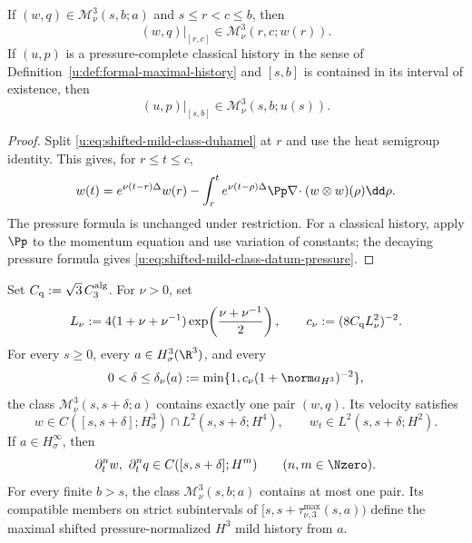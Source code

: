 \begin{lemma}
\label{u:lem:shifted-mild-restriction}
If \((w,q)\in\mathscr M_\nu^3(s,b;a)\) and
\(s\le r<c\le b\), then
\begin{equation}
 (w,q)|_{[r,c]}\in\mathscr M_\nu^3(r,c;w(r)).
 \label{u:eq:shifted-mild-restriction}
\end{equation}
If \((u,p)\) is a pressure-complete classical history in the sense of
Definition~\ref{u:def:formal-maximal-history} and
\([s,b]\) is contained in its interval of existence, then
\begin{equation}
 (u,p)|_{[s,b]}\in\mathscr M_\nu^3(s,b;u(s)).
 \label{u:eq:classical-mild-admission}
\end{equation}
\end{lemma}

\begin{proof}
Split \eqref{u:eq:shifted-mild-class-duhamel} at \(r\) and use the heat
semigroup identity.  This gives, for \(r\le t\le c\),
\[
 w(t)=e^{\nu(t-r)\Delta}w(r)
 -\int_r^t e^{\nu(t-\rho)\Delta}
 \Pp\nabla\!\cdot(w\otimes w)(\rho)\dd\rho.
\]
The pressure formula is unchanged under restriction.  For a classical
history, apply \(\Pp\) to the momentum equation and use variation of
constants; the decaying pressure formula gives
\eqref{u:eq:shifted-mild-class-datum-pressure}.
\end{proof}

\begin{theorem}
\label{u:thm:local-restart}
Set \(C_{\rm q}:=\sqrt3\,C_3^{\rm alg}\).  For \(\nu>0\), set
\[
 L_\nu:=4(1+\nu+\nu^{-1})
 \exp\!\left(\frac{\nu+\nu^{-1}}2\right),
 \qquad
 c_\nu:=(8C_{\rm q}L_\nu^2)^{-2}.
\]
For every \(s\ge0\), every \(a\in H^3_\sigma(\R^3)\), and every
\[
 0<\delta\le\delta_\nu(a)
 :=\min\{1,c_\nu(1+\norm a_{H^3})^{-2}\},
\]
the class \(\mathscr M_\nu^3(s,s+\delta;a)\) contains exactly one pair
\((w,q)\).  Its velocity satisfies
\[
 w\in C([s,s+\delta];H^3_\sigma)
 \cap L^2(s,s+\delta;H^4),
 \qquad
 w_t\in L^2(s,s+\delta;H^2).
\]
If \(a\in H^\infty_\sigma\), then
\[
 \partial_t^nw,\ \partial_t^nq
 \in C([s,s+\delta];H^m)
 \qquad(n,m\in\Nzero).
\]
For every finite \(b>s\), the class
\(\mathscr M_\nu^3(s,b;a)\) contains at most one pair.  Its compatible members
on strict subintervals of
\([s,s+\tau_{\nu,3}^{\max}(s,a))\) define the maximal shifted
pressure-normalized \(H^3\) mild history from \(a\).
\end{theorem}

